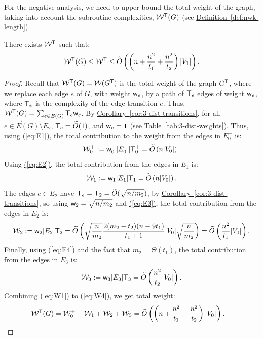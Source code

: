 \documentclass{article}
\newcommand{\eq}[1]{\hyperref[eq:#1]{(\ref*{eq:#1})}}
\newcommand{\cor}[1]{\hyperref[cor:#1]{Corollary~\ref*{cor:#1}}}
\newcommand{\tabl}[1]{\hyperref[tab:#1]{Table~\ref*{tab:#1}}}
\newcommand{\defin}[1]{\hyperref[def:#1]{Definition~\ref*{def:#1}}}
\renewcommand{\>}{\rangle}
\newcommand{\<}{\langle}
\renewcommand{\(}{\left(}
\renewcommand{\)}{\right)}
\def\w{{\sf w}}
\begin{document}
For the negative analysis, we need to upper bound the total weight of the graph, taking into account the subroutine complexities, ${\cal W}^{\sf T}(G)$ (see \defin{nwk-length}).
\begin{lemma}\label{lem:3-dist-negative}
There exists  ${\cal W}^{\sf T}$ such that:
$${\cal W}^{\sf T}(G)\leq {\cal W}^{\sf T}\leq \widetilde{O}\left(\left(n + \frac{n^2}{t_1} +\frac{n^2}{t_2}\right)|V_1|\right).$$
\end{lemma}
\begin{proof}
Recall that ${\cal W}^{\sf T}(G)={\cal W}(G^{\sf T})$ is the total weight of the graph $G^{\sf T}$, where we replace each edge $e$ of $G$, with weight $\w_e$, by a path of ${\sf T}_e$ edges of weight $\w_e$, where ${\sf T}_e$ is the complexity of the edge transition $e$. Thus, ${\cal W}^{\sf T}(G)=\sum_{e\in E(G)}{\sf T}_e\w_e$. By \cor{3-dist-transitions}, for all $e\in \overrightarrow{E}(G)\setminus E_2$, ${\sf T}_e=\widetilde{O}(1)$, and $\w_e=1$ (see \tabl{3-dist-weights}). Thus, using \eq{E1}, the total contribution to the weight from the edges in $E_0^+$ is:
\begin{equation}
{\cal W}_0^+ := \w_0^+|E_0^+|{\sf T}_0^+=\widetilde{O}\left({n}|V_0|\right).\label{eq:W1}
\end{equation}
Using \eq{E2}, the total contribution from the edges in $E_1$ is:
\begin{equation}
{\cal W}_1:= \w_1|E_1|{\sf T}_1 = \widetilde{O}\left(n|V_0|\right).\label{eq:W2}
\end{equation}
The edges $e\in E_2$ have ${\sf T}_e={\sf T}_2=\widetilde{O}(\sqrt{n/m_2})$, by \cor{3-dist-transitions}, so using $\w_2=\sqrt{n/m_2}$ and \eq{E3}, the total contribution from the edges in $E_2$ is:
\begin{equation}
{\cal W}_2:= \w_2|E_2|{\sf T}_2 =\widetilde{O}\left(\sqrt{\frac{n}{m_2}}\frac{2(m_2-t_2)(n-9t_1)}{t_1+1}|V_0|\sqrt{\frac{n}{m_2}}\right)
=\widetilde{O}\left(\frac{n^2}{t_1}|V_0|\right).\label{eq:W3}
\end{equation}
Finally, using \eq{E4} and the fact that $m_2=\Theta(t_1)$, the total contribution from the edges in $E_3$ is:
\begin{equation}
{\cal W}_3:= \w_3|E_3|{\sf T}_3 = \widetilde{O}\left(\frac{n^2}{t_2}|V_0|\right).\label{eq:W4}
\end{equation}
Combining \eq{W1} to \eq{W4}, we get total weight:
\begin{align*}
{\cal W}^{\sf T}(G) &= {\cal W}_0^++{\cal W}_1+{\cal W}_2+{\cal W}_3
 = \widetilde{O}\left(\left(n + \frac{n^2}{t_1}+\frac{n^2}{t_2}\right)|V_0| \right).\qedhere
\end{align*}
\end{proof}
\end{document}
